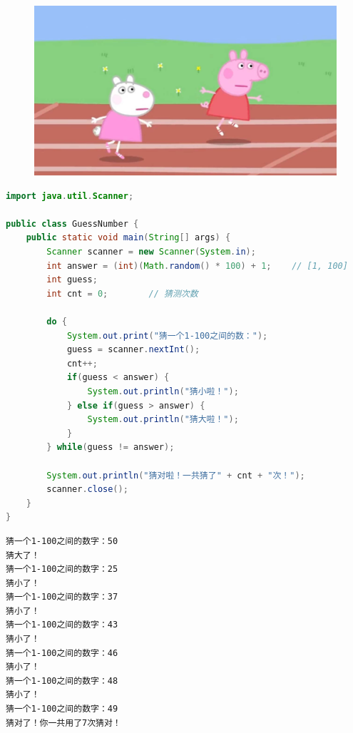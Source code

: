 \begin{figure}[H]
    \centering
    \includegraphics[scale=0.15]{img/Chapter4/4-3/1.png}
\end{figure}


\begin{lstlisting}[language=Java]
import java.util.Scanner;

public class GuessNumber {
    public static void main(String[] args) {
        Scanner scanner = new Scanner(System.in);
        int answer = (int)(Math.random() * 100) + 1;    // [1, 100]
        int guess;
        int cnt = 0;        // 猜测次数
        
        do {
            System.out.print("猜一个1-100之间的数：");
            guess = scanner.nextInt();
            cnt++;
            if(guess < answer) {
                System.out.println("猜小啦！");
            } else if(guess > answer) {
                System.out.println("猜大啦！");
            }
        } while(guess != answer);
        
        System.out.println("猜对啦！一共猜了" + cnt + "次！");
        scanner.close();
    }
}
\end{lstlisting}

\begin{tcolorbox}
    \begin{verbatim}
猜一个1-100之间的数字：50
猜大了！
猜一个1-100之间的数字：25
猜小了！
猜一个1-100之间的数字：37
猜小了！
猜一个1-100之间的数字：43
猜小了！
猜一个1-100之间的数字：46
猜小了！
猜一个1-100之间的数字：48
猜小了！
猜一个1-100之间的数字：49
猜对了！你一共用了7次猜对！
\end{verbatim}
\end{tcolorbox}

\newpage

